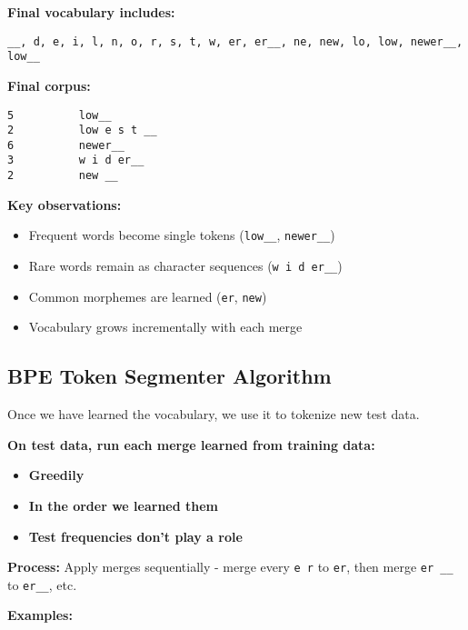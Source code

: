 \documentclass[11pt,a4paper]{article}
\theoremstyle{definition}
\theoremstyle{plain}
\theoremstyle{remark}
\begin{document}
\textbf{Final vocabulary includes:}
\begin{center}
\texttt{\_\_, d, e, i, l, n, o, r, s, t, w, er, er\_\_, ne, new, lo, low, newer\_\_, low\_\_}
\end{center}

\textbf{Final corpus:}
\begin{verbatim}
5          low__
2          low e s t __
6          newer__
3          w i d er__
2          new __
\end{verbatim}

\textbf{Key observations:}
\begin{itemize}
    \item Frequent words become single tokens (\texttt{low\_\_}, \texttt{newer\_\_})
    \item Rare words remain as character sequences (\texttt{w i d er\_\_})
    \item Common morphemes are learned (\texttt{er}, \texttt{new})
    \item Vocabulary grows incrementally with each merge
\end{itemize}

\subsection{BPE Token Segmenter Algorithm}

Once we have learned the vocabulary, we use it to tokenize new test data.

\textbf{On test data, run each merge learned from training data:}
\begin{itemize}
    \item \textbf{Greedily}
    \item \textbf{In the order we learned them}
    \item \textbf{Test frequencies don't play a role}
\end{itemize}

\textbf{Process:} Apply merges sequentially - merge every \texttt{e r} to \texttt{er}, then merge \texttt{er \_\_} to \texttt{er\_\_}, etc.

\textbf{Examples:}
\end{document}
